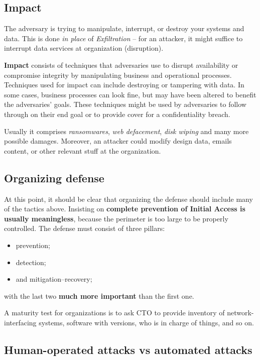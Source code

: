\documentclass[10pt]{extbook}
\begin{document}
\subsection{Impact}

The adversary is trying to manipulate, interrupt, or destroy your systems and
data. This is done \emph{in place} of \emph{Exfiltration} -- for an attacker,
it might suffice to interrupt data services at organization (disruption).

\textbf{Impact} consists of techniques that adversaries use to disrupt
availability or compromise integrity by manipulating business and operational
processes. Techniques used for impact can include destroying or tampering with
data. In some cases, business processes can look fine, but may have been
altered to benefit the adversaries’ goals. These techniques might be used by
adversaries to follow through on their end goal or to provide cover for a
confidentiality breach.

Usually it comprises \emph{ransomwares}, \emph{web defacement}, \emph{disk
wiping} and many more possible damages. Moreover, an attacker could modify
design data, emails content, or other relevant stuff at the organization.

\subsection{Organizing defense}

At this point, it should be clear that organizing the defense should include
many of the tactics above. Insisting on \textbf{complete prevention of Initial
Access is usually meaningless}, because the perimeter is too large to be
properly controlled. The defense must consist of three pillars:
\begin{itemize}
    \item prevention;
    \item detection;
    \item and mitigation\---recovery;
\end{itemize}
with the last two \textbf{much more important} than the first one.

A maturity test for organizations is to ask CTO to provide inventory of
network\--interfacing systems, software with versions, who is in charge of
things, and so on.

\subsection{Human\--operated attacks vs automated attacks}
\end{document}
